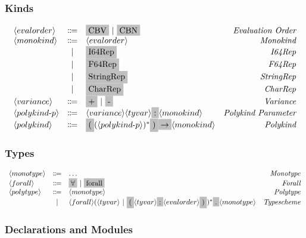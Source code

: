 \documentclass[11pt]{article}
\newcommand{\nonterminal}[1]{\langle #1 \rangle}
\newcommand{\terminal}[1]{\colorbox{lightgray}{\vphantom{X}#1}}
\begin{document}
\subsubsection{Kinds}
\[
  \begin{array}{lclr}
    \nonterminal{evalorder} & \Coloneqq & \terminal{CBV}\ |\ \terminal{CBN} & \emph{Evaluation Order} \\
    \nonterminal{monokind} & \Coloneqq & \nonterminal{evalorder} & \emph{Monokind} \\
    & | & \terminal{I64Rep} & \emph{I64Rep} \\
    & | & \terminal{F64Rep} & \emph{F64Rep} \\
    & | & \terminal{StringRep} & \emph{StringRep} \\
    & | & \terminal{CharRep} & \emph{CharRep} \\
    \nonterminal{variance} & \Coloneqq & \terminal{+}\ |\ \terminal{-} & \emph{Variance} \\
    \nonterminal{polykind$-$p} & \Coloneqq & \nonterminal{variance}\nonterminal{tyvar} \terminal{:} \nonterminal{monokind} & \emph{Polykind Parameter} \\
    \nonterminal{polykind} & \Coloneqq & \terminal{(} (\nonterminal{polykind$-$p})^{\ast}\terminal{)} \terminal{$\rightarrow$} \nonterminal{monokind} & \emph{Polykind} \\
  \end{array}
\]
\subsubsection{Types}
\[
  \begin{array}{lclr}
    \nonterminal{monotype} & \Coloneqq & \ldots & \emph{Monotype} \\
    \nonterminal{forall} & \Coloneqq & \terminal{$\forall$}\ |\ \terminal{forall} & \emph{Forall} \\
    \nonterminal{polytype} & \Coloneqq & \nonterminal{monotype} & \emph{Polytype} \\
    & | & \nonterminal{forall} (\nonterminal{tyvar}\ |\ \terminal{(} \nonterminal{tyvar} \terminal{:} \nonterminal{evalorder}\terminal{)})^{\ast}\terminal{.} \nonterminal{monotype} & \emph{Typescheme} \\
  \end{array}
\]
\subsubsection{Declarations and Modules}
\end{document}
